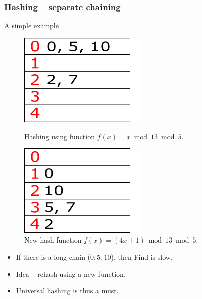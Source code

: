 \begin{frame}
	\frametitle{Hashing -- separate chaining}
	
	\begin{block}{A simple example}
		\begin{figure}
			\begin{minipage}[t]{.45\linewidth}
				\centering
				\includegraphics[width=0.55\textwidth]{sep_chain_fail.pdf}
				\caption{Hashing using function $f(x) = x \bmod 13 \bmod 5$.}
			\end{minipage}\hfill
			\begin{minipage}[t]{.45\linewidth}
				\centering
				\includegraphics[width=0.55\textwidth]{sep_chain_ok.pdf}
				\caption{New hash function $f(x) = (4x + 1) \bmod 13 \bmod 5$.}
			\end{minipage}
		\end{figure}

		\begin{itemize}
			\item If there is a long chain ($0, 5, 10$), then Find is slow.
			\item Idea -- rehash using a new function. 
			\item Universal hashing is thus a must.
		\end{itemize}
	\end{block}
\end{frame}

